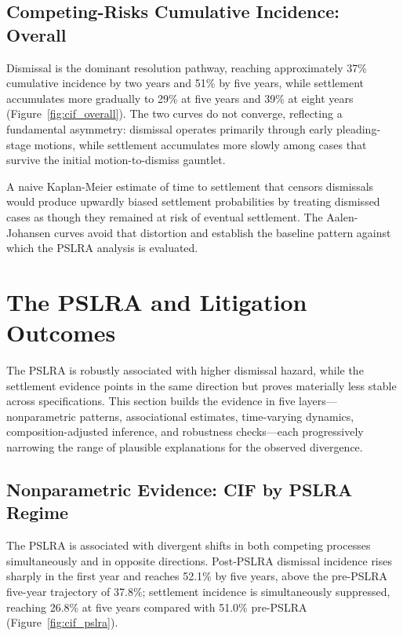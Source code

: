 \subsection{Competing-Risks Cumulative Incidence: Overall}

Dismissal is the dominant resolution pathway, reaching
approximately 37\% cumulative incidence by two years and
51\% by five years, while settlement accumulates more
gradually to 29\% at five years and 39\% at eight years
(Figure~\ref{fig:cif_overall}). The two curves do not
converge, reflecting a fundamental asymmetry: dismissal
operates primarily through early pleading-stage motions,
while settlement accumulates more slowly among cases that
survive the initial motion-to-dismiss gauntlet.

A naive Kaplan-Meier estimate of time to settlement that
censors dismissals would produce upwardly biased settlement
probabilities by treating dismissed cases as though they
remained at risk of eventual settlement. The Aalen-Johansen
curves avoid that distortion and establish the baseline
pattern against which the PSLRA analysis is evaluated.


\section{The PSLRA and Litigation Outcomes}
\label{sec:results_pslra}

The PSLRA is robustly associated with higher dismissal
hazard, while the settlement evidence points in the same
direction but proves materially less stable across
specifications. This section builds the evidence in five layers---nonparametric patterns,
associational estimates, time-varying dynamics,
composition-adjusted inference, and robustness
checks---each progressively narrowing the range of plausible
explanations for the observed divergence.

\subsection{Nonparametric Evidence: CIF by PSLRA Regime}

The PSLRA is associated with divergent shifts in both
competing processes simultaneously and in opposite
directions. Post-PSLRA dismissal incidence rises sharply in
the first year and reaches 52.1\% by five years, above the
pre-PSLRA five-year trajectory of 37.8\%; settlement
incidence is simultaneously suppressed, reaching 26.8\% at
five years compared with 51.0\% pre-PSLRA
(Figure~\ref{fig:cif_pslra}).

